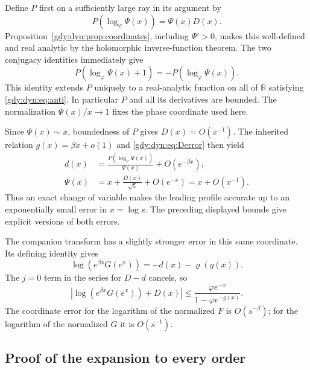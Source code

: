 \documentclass[11pt]{article}
\numberwithin{equation}{section}
\theoremstyle{definition}
\theoremstyle{remark}
\begin{document}
Define $P$ first on a sufficiently large ray in its argument by
\begin{equation}\label{gdy:dyn:eq:Pdefine}
 P(\log_\varphi\Psi(x))=\Psi(x)D(x).
\end{equation}
Proposition~\ref{gdy:dyn:prop:coordinates}, including $\Psi'>0$, makes this
well-defined and real analytic by the holomorphic inverse-function
theorem.
The two conjugacy identities immediately give
\[
 P(\log_\varphi\Psi(x)+1)=-P(\log_\varphi\Psi(x)).
\]
This identity extends $P$ uniquely to a real-analytic function on all of
$\mathbb R$ satisfying \eqref{gdy:dyn:eq:anti}. In particular $P$ and all
its derivatives are bounded. The normalization
$\Psi(x)/x\to1$ fixes the phase coordinate used here.

Since $\Psi(x)\sim x$, boundedness of $P$ gives $D(x)=O(x^{-1})$.
The inherited relation $g(x)=\beta x+o(1)$ and
\eqref{gdy:dyn:eq:Derror} then yield
\begin{equation}\label{gdy:dyn:eq:sharpcoords}
 \begin{aligned}
 d(x)&=\frac{P(\log_\varphi\Psi(x))}{\Psi(x)}+O(e^{-\beta x}),\\
 \Psi(x)&=x+\frac{D(x)}{\sqrt5}+O(e^{-x})=x+O(x^{-1}).
 \end{aligned}
\end{equation}
Thus an exact change of variable makes the leading profile accurate up
to an exponentially small error in $x=\log s$. The preceding displayed
bounds give explicit versions of both errors.

The companion transform has a slightly stronger error in this same
coordinate. Its defining identity gives
\[
 \log(e^{\beta x}G(e^x))=-d(x)-\varrho(g(x)).
\]
The $j=0$ term in the series for $D-d$ cancels, so
\begin{equation}\label{gdy:dyn:eq:Gcoord}
 \left|\log(e^{\beta x}G(e^x))+D(x)\right|
 \le\frac{\varphi e^{-x}}{1-\varphi e^{-g(x)}}.
\end{equation}
The coordinate error for the logarithm of the normalized $F$ is
$O(s^{-\beta})$; for the logarithm of the normalized $G$ it is
$O(s^{-1})$.

\subsection{Proof of the expansion to every order}
\label{gdy:dyn:sub:reversion}
\end{document}
